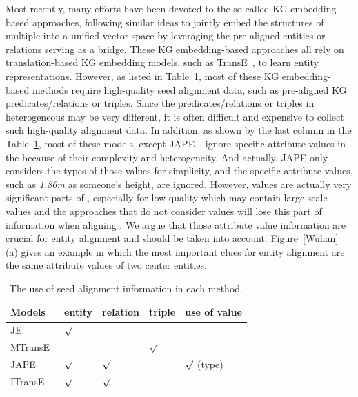 	Most recently, many efforts have been devoted to the so-called KG embedding-based approaches, following similar ideas to jointly embed
the structures of multiple \KGs into a unified vector space by leveraging the pre-aligned entities or relations serving as a bridge. These
KG embedding-based approaches all rely on translation-based KG embedding models, such as TransE~\cite{bordes2013translating}, to learn
entity representations. However, as listed in Table~\ref{seed}, most of these KG embedding-based methods require high-quality seed
alignment data, such as pre-aligned KG predicates/relations or triples. Since the predicates/relations or triples in heterogeneous \KGs may
be very different, it is often difficult and expensive to collect such high-quality alignment data. In addition, as shown by the last
column in the Table~\ref{seed}, most of these models, except JAPE~\cite{sun2017cross}, ignore specific attribute values in the \KGs because
of their complexity and heterogeneity. And actually, JAPE only considers the types of those values for simplicity, and the specific
attribute values, such as \textit{1.86m} as someone's height, are ignored. However, values are actually very significant parts of \KGs, especially for low-quality \KGs which may contain large-scale values and the approaches that do not consider values will lose this part of information when aligning \KGs. We argue that those attribute value information are crucial for entity alignment and should be taken into account. Figure~\ref{Wuhan} (a) gives an example in which the most important clues for entity alignment are the same attribute values of two center entities.
	\begin{table}
		\centering
		\scriptsize
		\begin{tabular}{lllll}
			\toprule
			\bf Models & \bf entity & \bf relation & \bf triple & \bf use of value \\
			\midrule
			JE~\cite{hao2016joint} & ${\surd}$ & & & \\
			MTransE~\cite{chen2016multilingual} & $ $ & $ $ & ${\surd}$ & \\
			JAPE~\cite{sun2017cross} & ${\surd}$& ${\surd}$& & ${\surd}$ (type)\\
			ITransE~\cite{zhu2017iterative} & ${\surd}$ & ${\surd}$& & \\
			\bottomrule
		\end{tabular}
		\caption{The use of seed alignment information in each method.}
		\label{seed}
	\end{table}
	
